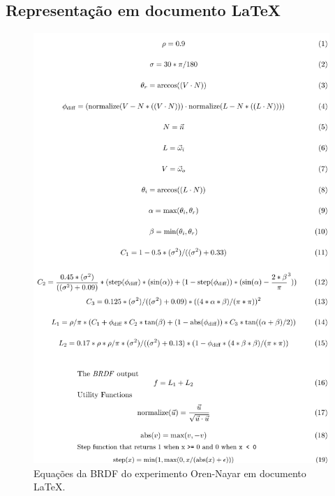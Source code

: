 \subsection{Representação em documento \LaTeX{}}
\begin{figure}[H]
    \caption{\label{fig-oren-nayar-eqlang-latex} 
    \small Equações da BRDF do experimento Oren-Nayar em documento \LaTeX{}.}
    \begin{center}
        \includegraphics[scale=0.82]{./Imagens/brdfs/oren-nayar.pdf}
    \end{center}
\end{figure}

